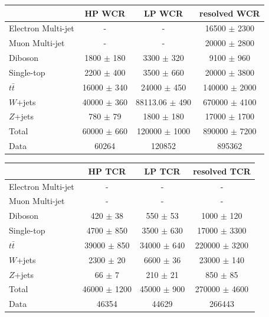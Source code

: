 \begin{table}
\begin{tabular}{|l|c|c|c|}
\hline
	  &	 HP WCR &	 LP WCR &	resolved WCR \\\hline 
	Electron Multi-jet &	- &	- &	16500 $\pm$ 2300 \\\hline 
	Muon Multi-jet &	- &	- &	20000 $\pm$ 2800 \\\hline 
	Diboson &	1800 $\pm$ 180 &	3300 $\pm$ 320 &	9100 $\pm$ 960 \\\hline 
	Single-top &	2200 $\pm$ 400 &	3500 $\pm$ 660 &	20000 $\pm$ 3800 \\\hline 
	$t\bar{t}$ &	16000 $\pm$ 340 &	24000 $\pm$ 450&	140000 $\pm$ 2000 \\\hline 
	$W$+jets &	40000 $\pm$ 360 &	88113.06 $\pm$ 490 &	670000 $\pm$ 4100 \\\hline 
	$Z$+jets &	780 $\pm$ 79 &	1800 $\pm$ 180 &	17000 $\pm$ 1700 \\\hline 
	Total &	60000 $\pm$ 660 &	120000 $\pm$ 1000 &	890000 $\pm$ 7200 \\\hline 
	Data &	60264 &	120852 &	895362 \\\hline 
\end{tabular}

 
\begin{tabular}{|l|c|c|c|}
\hline
	  &	 HP  TCR &	 LP  TCR &	resolved TCR \\\hline 
	Electron Multi-jet &	- &	- &	- \\\hline 
	Muon Multi-jet &	- &	- &	- \\\hline 
	Diboson &	420 $\pm$ 38 &	550 $\pm$ 53 &	1000 $\pm$ 120 \\\hline 
	Single-top &	4700 $\pm$ 850 &	3500 $\pm$ 630 &	17000 $\pm$ 3300 \\\hline 
	$t\bar{t}$ &	39000 $\pm$ 850 &	34000 $\pm$ 640 &	220000 $\pm$ 3200 \\\hline 
	$W$+jets &	2300 $\pm$ 20 &	6600 $\pm$ 36 &	23000 $\pm$ 140 \\\hline 
	$Z$+jets &	66 $\pm$ 7 &	210 $\pm$ 21 &	850 $\pm$ 85 \\\hline 
	Total &	46000 $\pm$ 1200 &	45000 $\pm$ 900 &	270000 $\pm$ 4600 \\\hline 
	Data &	46354 &	44629 &	266443 \\\hline 
\end{tabular}


\end{table}
